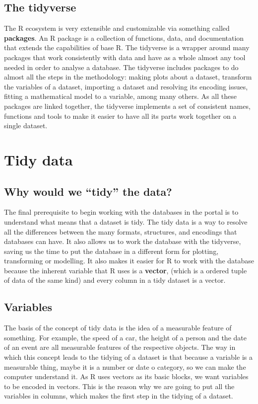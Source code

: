 \documentclass[]{book}
\begin{document}
\subsection{The tidyverse}\label{the-tidyverse}

The R ecosystem is very extensible and customizable via something called
\textbf{packages}. An R package is a collection of functions, data, and
documentation that extends the capabilities of base R. The tidyverse is
a wrapper around many packages that work consistently with data and have
as a whole almost any tool needed in order to analyse a database. The
tidyverse includes packages to do almost all the steps in the
methodology: making plots about a dataset, transform the variables of a
dataset, importing a dataset and resolving its encoding issues, fitting
a mathematical model to a variable, among many others. As all these
packages are linked together, the tidyverse implements a set of
consistent names, functions and tools to make it easier to have all its
parts work together on a single dataset.

\section{Tidy data}\label{tidy-data}

\subsection{\texorpdfstring{Why would we ``tidy'' the
data?}{Why would we tidy the data?}}\label{why-would-we-tidy-the-data}

The final prerequisite to begin working with the databases in the portal
is to understand what means that a dataset is tidy. The tidy data is a
way to resolve all the differences between the many formats, structures,
and encodings that databases can have. It also allows us to work the
database with the tidyverse, saving us the time to put the database in a
different form for plotting, transforming or modelling. It also makes it
easier for R to work with the database because the inherent variable
that R uses is a \textbf{vector}, (which is a ordered tuple of data of
the same kind) and every column in a tidy dataset is a vector.

\subsection{Variables}\label{variables}

The basis of the concept of tidy data is the idea of a measurable
feature of something. For example, the speed of a car, the height of a
person and the date of an event are all measurable features of the
respective objects. The way in which this concept leads to the tidying
of a dataset is that because a variable is a measurable thing, maybe it
is a number or date o category, so we can make the computer understand
it. As R uses vectors as its basic blocks, we want variables to be
encoded in vectors. This is the reason why we are going to put all the
variables in columns, which makes the first step in the tidying of a
dataset.
\end{document}
